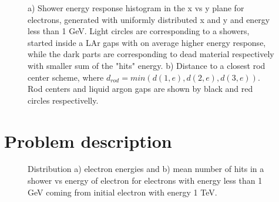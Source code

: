 \begin{figure}[!b]
\begin{minipage}[h]{0.49\linewidth}
\end{minipage}
\hfill
\begin{minipage}[h]{0.49\linewidth}
\end{minipage}
\caption{ a) Shower energy response histogram in the x vs y plane for electrons, generated with uniformly distributed x and y and energy less than 1 GeV. Light circles are corresponding to a showers, started inside a LAr gaps with on average higher energy response, while the dark parts are corresponding to dead material respectively with smaller sum of the "hits" energy.
b) Distance to a closest rod center scheme, where $d_{rod} = min( d(1,e), d(2, e), d(3, e))$. Rod centers and liquid argon gaps are shown by black and red circles respectivelly.}
\label{fig:FSFluctuations}
\end{figure}



\section{Problem description}\label{sec:FSproblem}








\begin{figure}[!b]
\begin{minipage}[h]{0.49\linewidth}
\end{minipage}
\hfill
\begin{minipage}[h]{0.49\linewidth}
\end{minipage}
\caption{Distribution a) electron energies and b) mean number of hits in a shower vs energy of electron for electrons with energy less than 1 GeV coming from initial electron with energy 1 TeV. }
\label{fig:TrackEnergy}
\end{figure}


